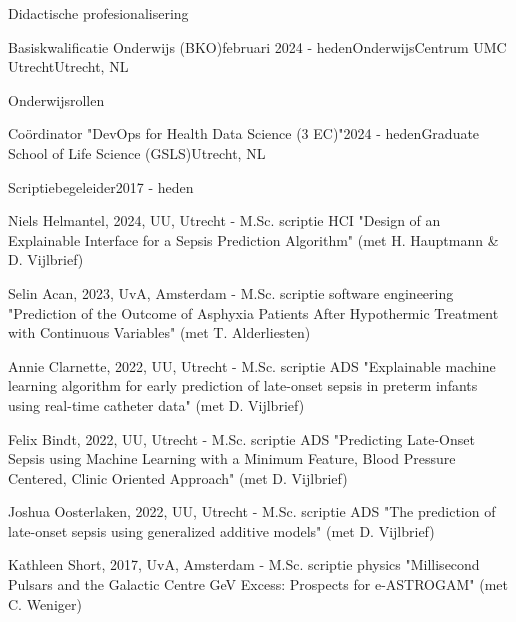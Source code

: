 \begin{rSection}{Didactische profesionalisering}
\begin{rSubsection}{Basiskwalificatie Onderwijs (BKO)}{februari 2024 - heden}{OnderwijsCentrum UMC Utrecht}{Utrecht, NL}
  \vspace{-1.5em}
\end{rSubsection}
\end{rSection}

\begin{rSection}{Onderwijsrollen}
\begin{rSubsection}{Co\"{o}rdinator "DevOps for Health Data Science (3 EC)"}{2024 - heden}{Graduate School of Life Science (GSLS)}{Utrecht, NL}
  \vspace{-1.5em}
\end{rSubsection}

\begin{rSubsection}{Scriptiebegeleider}{2017 - heden}{}{}
    \vspace{-1.5em}
    \item Niels Helmantel, 2024, UU, Utrecht - M.Sc. scriptie HCI "Design of an Explainable Interface for a Sepsis Prediction Algorithm" (met H. Hauptmann \& D. Vijlbrief)
    \item Selin Acan, 2023, UvA, Amsterdam - M.Sc. scriptie software engineering "Prediction of the Outcome of Asphyxia Patients After Hypothermic Treatment with Continuous Variables" (met T. Alderliesten)
    \item Annie Clarnette, 2022, UU, Utrecht - M.Sc. scriptie ADS "Explainable machine learning algorithm for early prediction of late-onset sepsis in preterm infants using real-time catheter data" (met D. Vijlbrief)
    \item Felix Bindt, 2022, UU, Utrecht - M.Sc. scriptie ADS "Predicting Late-Onset Sepsis using Machine Learning with a Minimum Feature, Blood Pressure Centered, Clinic Oriented Approach" (met D. Vijlbrief)
    \item Joshua Oosterlaken, 2022, UU, Utrecht - M.Sc. scriptie ADS "The prediction of late-onset sepsis using generalized additive models" (met D. Vijlbrief)
    \item Kathleen Short, 2017, UvA, Amsterdam - M.Sc. scriptie physics "Millisecond Pulsars and the Galactic Centre GeV Excess: Prospects for e-ASTROGAM" (met C. Weniger) 
  \end{rSubsection}

\end{rSection}

